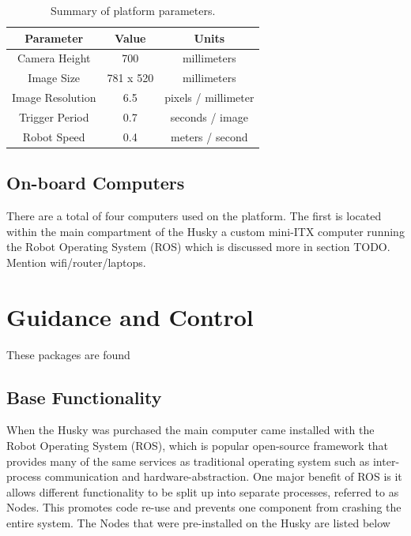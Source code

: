 \begin{table}[htb]
    \begin{center}
    \caption{Summary of platform parameters.}
    \begin{tabular}[c]{|c|c|c|}
        \hline
        Parameter & Value & Units \\
        \hline
        Camera Height    & 700       & millimeters         \\
        Image Size       & 781 x 520 & millimeters         \\
        Image Resolution & 6.5       & pixels / millimeter \\
        Trigger Period   & 0.7       & seconds / image     \\
        Robot Speed      & 0.4       & meters / second     \\
        \hline
    \end{tabular}
    \label{table:platform_params}
   \end{center}
\end{table}

\subsection{On-board Computers}

There are a total of four computers used on the platform.  The first is located within the main compartment of the Husky a custom mini-ITX computer running the Robot Operating System (ROS) which is discussed more in section TODO.  
Mention wifi/router/laptops.  

\section{Guidance and Control}
\label{system-modes}

These packages are found 

\subsection{Base Functionality}

When the Husky was purchased the main computer came installed with the Robot Operating System (ROS), which is popular open-source framework that provides many of the same services as traditional operating system such as inter-process communication and hardware-abstraction.  One major benefit of ROS is it allows different functionality to be split up into separate processes, referred to as Nodes.  This promotes code re-use and prevents one component from crashing the entire system.   The Nodes that were pre-installed on the Husky are listed below

